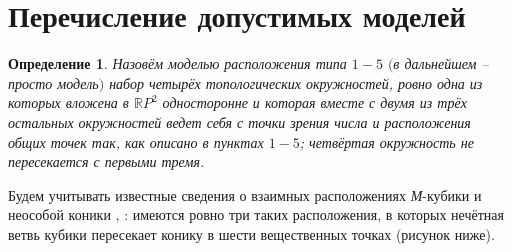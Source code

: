 \documentclass[11pt]{article}
\newtheorem{definition}{Определение}
\begin{document}
\section{Перечисление допустимых моделей}
\begin{definition}
Назовём моделью расположения типа $1-5$ $($в дальнейшем -- просто модель$)$ набор четырёх топологических окружностей, ровно одна из которых вложена в $\mathbb RP^2$ односторонне и которая вместе с двумя из трёх остальных окружностей ведет себя с точки зрения числа и расположения общих точек так, как описано в пунктах $1-5$; четвёртая окружность не пересекается с первыми тремя.
\end{definition}

Будем учитывать известные сведения о взаимных расположениях \textit{М}-кубики и неособой коники \cite{litlink2}, \cite{litlink3}: имеются ровно три таких расположения, в которых нечётная ветвь кубики пересекает конику в шести вещественных точках (рисунок ниже).
\end{document}
